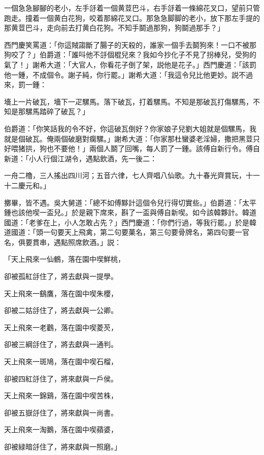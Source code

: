 \begin{myquote}
一個急急腳腳的老小，左手㧱着一個黄荳巴斗，右手㧱着一條綿花叉口，望前只管跑走。撞着一個黄白花狗，咬着那綿花叉口。那急急脚脚的老小，放下那左手提的那黄荳巴斗，走向前去打黄白花狗。不知手鬬過那狗，狗鬬過那手？」
\end{myquote}

西門慶笑罵道：「你這賊謅斷了腸子的天殺的，誰家一個手去鬬狗來！一口不被那狗咬了？」伯爵道：「誰呌他不㧱個棍兒來？我如今抄化子不見了拐棒兒，受狗的氣了！」謝希大道：「大官人，你看花子倒了架，説他是花子。」西門慶道：「該罰他一鍾，不成個令。謝子純，你行罷。」謝希大道：「我這令兒比他更妙。説不過來，罰一鍾：

\begin{myquote}
墻上一片破瓦，墻下一疋騾馬。落下破瓦，打着騾馬。不知是那破瓦打傷騾馬，不知是那騾馬踏碎了破瓦？」
\end{myquote}

伯爵道：「你笑話我的令不好，你這破瓦倒好？你家娘子兒劉大姐就是個騾馬，我就是個破瓦。俺兩個破磨對瘸騾。」謝希大道：「你家那杜蠻婆老淫婦，撒把黑荳只好喂猪拱，狗也不要他！」兩個人鬬了回嘴，每人罰了一鍾。該傅自新行令。傅自新道：「小人行個江湖令，遇點飲酒，先一後二：

\begin{myquote}
一舟二櫓，三人搖出四川河；五音六律，七人齊唱八仙歌。九十春光齊賞玩，十一十二慶元和。」
\end{myquote}

擲畢，皆不遇。吳大舅道：「總不如傅黟計這個令兒行得切實些。」伯爵道：「太平鍾也該他喫一盃兒。」於是親下席來，斟了一盃與傅自新喫。如今該韓夥計。韓道國道：「老爹在上，小人怎敢占先？」西門慶道：「你們行過，等我行罷。」於是韓道國道：「頭一句要天上飛禽，第二句要菓名，第三句要骨牌名，第四句要一官名，俱要貫串，遇點照席飲酒。」説：

\begin{myquote}
「天上飛來一仙鶴，落在園中喫鮮桃，

卻被孤紅㧱住了，將去獻與一提學。

天上飛來一鷂鷹，落在園中喫朱櫻，

卻被二姑㧱住了，將去獻與一公卿。

天上飛來一老鸛，落在園中喫菱芡，

卻被三綱㧱住了，將去獻與一通判。

天上飛來一斑鳩，落在園中喫石榴，

卻被四紅㧱住了，將來獻與一戶侯。

天上飛來一錦鷄，落在園中喫苦株，

卻被五嶽㧱住了，將來獻與一尚書。

天上飛來一淘鵝，落在園中喫蘋婆，

卻被緑暗㧱住了，將來獻與一照磨。」
\end{myquote}

